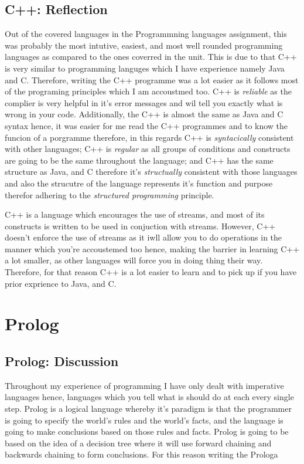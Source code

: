 \documentclass[
	12pt, %
]{fphw}
\begin{document}
\subsection{C++: Reflection}
Out of the covered languages in the Programmning languages assignment, this was
probably the most intutive, easiest, and most well rounded programming languages as
compared to the ones coverred in the unit. This is due to that C++ is very similar
to programming languges which I have experience namely Java and C. Therefore,
writing the C++ programme was a lot easier as it follows most of the programing
principles which I am accoustmed too. C++ is \emph{reliable} as the complier is
very helpful in it's error messages and wil tell you exactly what is wrong in
your code. Additionally, the C++ is almost the same as Java and C syntax hence,
it was easier for me read the C++ programmes and to know the funcion of a
porgramme therefore, in this regards C++ is \emph{syntacically} consistent with
other languages; C++ is \emph{regular} as all groups of conditions and constructs
are going to be the same throughout the language; and C++ has the same structure
as Java, and C therefore it's \emph{structually} consistent with those languages
and also the strucutre of the language represents it's function and purpose therefor
adhering to the \emph{structured programming} principle.\par

C++ is a language which encourages the use of streams, and most of its constructs
is written to be used in conjuction with streams. However, C++ doesn't enforce
the use of streams as it iwll allow you to do operations in the manner which you're
accoustemed too hence, making the barrier in learning C++ a lot smaller, as other
languages will force you in doing thing their way. Therefore, for that reason
C++ is a lot easier to learn and to pick up if you have prior exprience to Java,
and C.

\section{Prolog}

\subsection{Prolog: Discussion}
Throughout my experience of programming I have only dealt with imperative languages
hence, languages which you tell what is should do at each every single step.
Prolog is a logical language whereby it's paradigm is that the programmer is
going to specify the world's rules and the world's facts, and the language is
going to make conclusions based on those rules and facts. Prolog is going to be
based on the idea of a decision tree where it will use forward chaining and
backwards chaining to form conclusions. For this reason writing the Prologa
\end{document}
